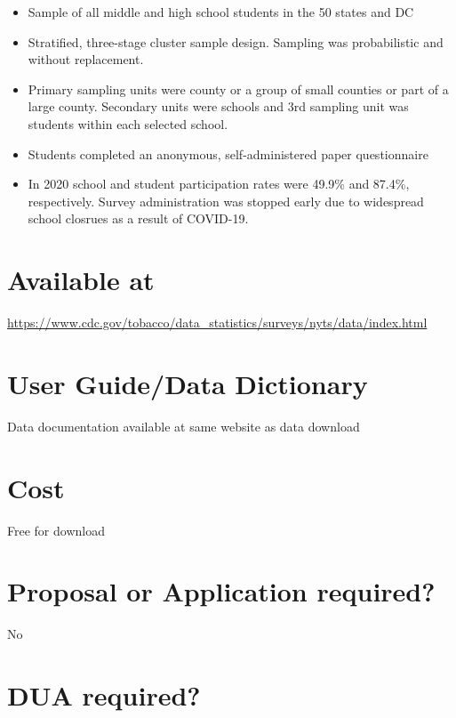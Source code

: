 \documentclass[
]{book}
\providecommand{\tightlist}{%
  \setlength{\itemsep}{0pt}\setlength{\parskip}{0pt}}
\begin{document}
\begin{itemize}
\tightlist
\item
  Sample of all middle and high school students in the 50 states and DC
\item
  Stratified, three-stage cluster sample design. Sampling was probabilistic and without replacement.
\item
  Primary sampling units were county or a group of small counties or part of a large county. Secondary units were schools and 3rd sampling unit was students within each selected school.
\item
  Students completed an anonymous, self-administered paper questionnaire
\item
  In 2020 school and student participation rates were 49.9\% and 87.4\%, respectively. Survey administration was stopped early due to widespread school closrues as a result of COVID-19.
\end{itemize}

\hypertarget{available-at-67}{%
\section{Available at}\label{available-at-67}}

\url{https://www.cdc.gov/tobacco/data_statistics/surveys/nyts/data/index.html}

\hypertarget{user-guidedata-dictionary-67}{%
\section{User Guide/Data Dictionary}\label{user-guidedata-dictionary-67}}

Data documentation available at same website as data download

\hypertarget{cost-67}{%
\section{Cost}\label{cost-67}}

Free for download

\hypertarget{proposal-or-application-required-67}{%
\section{Proposal or Application required?}\label{proposal-or-application-required-67}}

No

\hypertarget{dua-required-67}{%
\section{DUA required?}\label{dua-required-67}}
\end{document}
